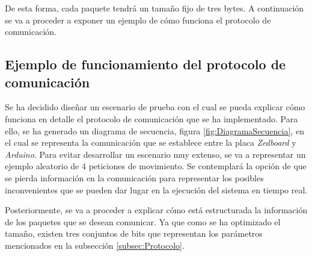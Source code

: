 De esta forma, cada paquete tendrá un tamaño fijo de tres bytes. A continuación se va a proceder a exponer un ejemplo de cómo funciona el protocolo de comunicación.

\subsection{Ejemplo de funcionamiento del protocolo de comunicación}\label{subsec:EjemploProtocolo}

Se ha decidido diseñar un escenario de prueba con el cual se pueda explicar cómo funciona en detalle el protocolo de comunicación que se ha implementado. Para ello, se ha generado un diagrama de secuencia, figura \ref{fig:DiagramaSecuencia}, en el cual se representa la comunicación que se establece entre la placa \emph{Zedboard} y \emph{Arduino}. Para evitar desarrollar un escenario muy extenso, se va a representar un ejemplo aleatorio de 4 peticiones de movimiento. Se contemplará la opción de que se pierda información en la comunicación para representar los posibles inconvenientes que se pueden dar lugar en la ejecución del sistema en tiempo real. 

Posteriormente, se va a proceder a explicar cómo está estructurada la información de los paquetes que se desean comunicar. Ya que como se ha optimizado el tamaño, existen tres conjuntos de bits que representan los parámetros mencionados en la subsección \ref{subsec:Protocolo}.


